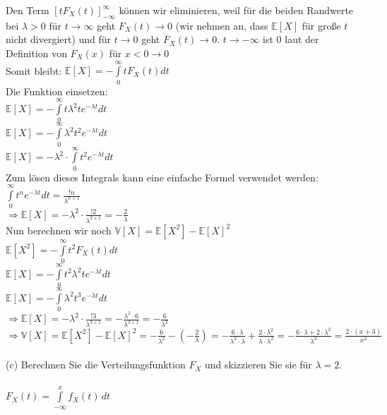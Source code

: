 \documentclass[a4paper]{article}
\begin{document}
Den Term $[tF_X(t)]_{-\infty}^\infty$ können wir eliminieren, weil für die beiden Randwerte bei $\lambda > 0$ für $t \rightarrow \infty$ geht $F_X(t) \rightarrow 0$ (wir nehmen an, dass $\mathbb{E}[X]$ für große $t$ nicht divergiert) und für $t \rightarrow 0$ geht $F_X(t) \rightarrow 0$. $t \rightarrow - \infty$ ist $0$ laut der Definition von $F_X(x)$ für $x < 0 \rightarrow 0$\\
Somit bleibt: $\mathbb{E}[X] = - \int\limits_0^\infty t F_X(t) dt$\\
Die Funktion einsetzen:\\
$\mathbb{E}[X] = - \int\limits_0^\infty t \lambda^2te^{-\lambda t} dt$\\
$\mathbb{E}[X] = - \int\limits_0^\infty \lambda^2t^2e^{-\lambda t} dt$\\
$\mathbb{E}[X] = - \lambda^2 \cdot \int\limits_0^\infty t^2e^{-\lambda t} dt$\\
Zum lösen dieses Integrals kann eine einfache Formel verwendet werden: $\int\limits_0^\infty t^ne^{-\lambda t} dt = \frac{!n}{\lambda^{n + 1}}$\\
$\Rightarrow \mathbb{E}[X] = - \lambda^2 \cdot \frac{!2}{\lambda^{2 + 1}} = - \frac{2}{\lambda}$\\
Nun berechnen wir noch $\mathbb{V}[X] = \mathbb{E}[X^2] - \mathbb{E}[X]^2$\\
$\mathbb{E}[X^2] = - \int\limits_0^\infty t^2 F_X(t) dt$\\
$\mathbb{E}[X] = - \int\limits_0^\infty t^2 \lambda^2te^{-\lambda t} dt$\\
$\mathbb{E}[X] = - \int\limits_0^\infty \lambda^2t^3e^{-\lambda t} dt$\\
$\Rightarrow \mathbb{E}[X] = - \lambda^2 \cdot \frac{!3}{\lambda^{3 + 1}}= - \frac{\lambda^2 \cdot 6}{\lambda^{3 + 1}} = - \frac{6}{\lambda^2}$\\
$\Rightarrow \mathbb{V}[X] = \mathbb{E}[X^2] - \mathbb{E}[X]^2 = - \frac{6}{\lambda^2} - \left(- \frac{2}{\lambda}\right) = - \frac{6 \cdot \lambda}{\lambda^2 \cdot \lambda} + \frac{2 \cdot \lambda^2}{\lambda \cdot \lambda^2} = - \frac{6 \cdot \lambda + 2 \cdot \lambda^2}{\lambda^3} = \frac{2 \cdot (x + 3)}{x^2}$
\\\\
(c) Berechnen Sie die Verteilungsfunktion $F_X$ und skizzieren Sie sie für $\lambda = 2$.\\\\
\(F_X(t) = \int\limits^x_{-\infty} f_X(t)\, dt\)\\\\
\end{document}
